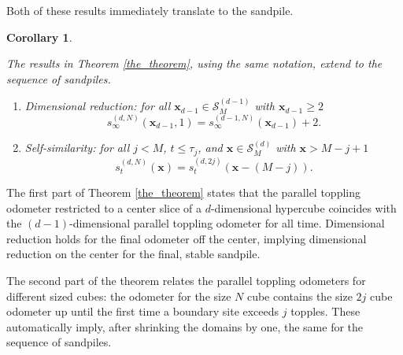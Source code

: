 \documentclass[12pt]{amsart}
\newtheorem{corollary}{Corollary}[section]
\begin{document}
	Both of these results immediately translate to the sandpile. 
	\begin{corollary}\label{sandpile_corollary} 
	
		The results in Theorem \ref{the_theorem}, using the same notation, extend to the sequence of sandpiles. 	
		\begin{enumerate}
			\item{Dimensional reduction:} for all $\mathbf{x}_{d-1} \in \mathcal{S}_M^{(d-1)}$ with $\mathbf{x}_{d-1} \geq 2$
			\[
			s_{\infty}^{(d,N)}(\mathbf{x}_{d-1},1)  = s_{\infty}^{(d-1,N)}(\mathbf{x}_{d-1})+2.
			\]
			\item{Self-similarity:} for all $j < M$, $t \leq \tau_j$, and $\mathbf{x} \in \mathcal{S}_M^{(d)}$ with $\mathbf{x} > M-j+1$
			\[
			s_t^{(d,N)}(\mathbf{x}) = s_t^{(d,2 j)}(\mathbf{x}-(M-j)).
			\]
			\end{enumerate}

	\end{corollary}
	
	The first part of Theorem \ref{the_theorem} states that the parallel toppling odometer restricted to a center slice of a $d$-dimensional hypercube coincides 
	with the $(d-1)$-dimensional parallel toppling odometer for all time.  Dimensional reduction holds for the final odometer off the center, implying dimensional reduction 
	on the center for the final, stable sandpile. 
	
	The second part of the theorem relates the parallel toppling odometers for different sized cubes: 
	the odometer for the size $N$ cube contains the size $2 j$ cube odometer up until the first time a boundary site exceeds $j$ topples. These automatically imply, after shrinking the domains by one, the same for the sequence of sandpiles.
	
	
	
	
	
\end{document}
